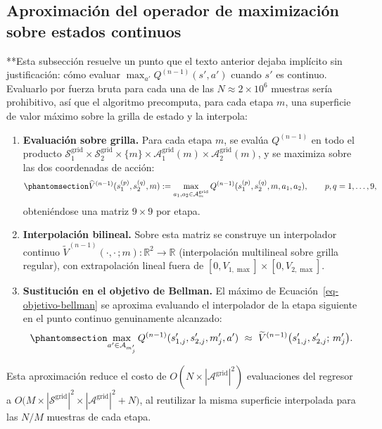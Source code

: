 \documentclass[
  spanish,
  letterpaper,
]{scrreprt}
\theoremstyle{definition}
\theoremstyle{remark}
\begin{document}
\subsection{Aproximación del operador de maximización sobre estados
continuos}\label{sec-max-operador}

**Esta subsección resuelve un punto que el texto anterior dejaba
implícito sin justificación: cómo evaluar \(\max_{a'}Q^{(n-1)}(s',a')\)
cuando \(s'\) es continuo. Evaluarlo por fuerza bruta para cada una de
las \(N\approx 2\times10^6\) muestras sería prohibitivo, así que el
algoritmo precomputa, para cada etapa \(m\), una superficie de valor
máximo sobre la grilla de estado y la interpola:

\begin{enumerate}
\def\labelenumi{\arabic{enumi}.}
\item
  \textbf{Evaluación sobre grilla.} Para cada etapa \(m\), se evalúa
  \(Q^{(n-1)}\) en todo el producto
  \(\mathcal S_1^{\text{grid}}\times\mathcal S_2^{\text{grid}}\times\{m\}\times\mathcal A_1^{\text{grid}}(m)\times\mathcal A_2^{\text{grid}}(m)\),
  y se maximiza sobre las dos coordenadas de acción:
  \begin{equation}\protect\phantomsection\label{eq-maxq-grilla}{\widehat V^{(n-1)}(s_1^{(p)},s_2^{(q)},m) := \max_{a_1,a_2\in\mathcal A_m^{\text{grid}}} Q^{(n-1)}(s_1^{(p)},s_2^{(q)},m,a_1,a_2), \qquad p,q=1,\dots,9,}\end{equation}
  obteniéndose una matriz \(9\times9\) por etapa.
\item
  \textbf{Interpolación bilineal.} Sobre esta matriz se construye un
  interpolador continuo
  \(\widetilde V^{(n-1)}(\cdot,\cdot\,;m):\mathbb R^2\to\mathbb R\)
  (interpolación multilineal sobre grilla regular), con extrapolación
  lineal fuera de \([0,V_{1,\max}]\times[0,V_{2,\max}]\).
\item
  \textbf{Sustitución en el objetivo de Bellman.} El máximo de
  Ecuación~\ref{eq-objetivo-bellman} se aproxima evaluando el
  interpolador de la etapa siguiente en el punto continuo genuinamente
  alcanzado:
  \begin{equation}\protect\phantomsection\label{eq-maxq-interp}{\max_{a'\in\mathcal A_{m_j'}} Q^{(n-1)}(s'_{1,j},s'_{2,j},m_j',a') \ \approx\ \widetilde V^{(n-1)}\big(s'_{1,j},s'_{2,j};\,m_j'\big).}\end{equation}
\end{enumerate}

Esta aproximación reduce el costo de
\(O(N\times|\mathcal A^{\text{grid}}|^2)\) evaluaciones del regresor a
\(O\big(M\times|\mathcal S^{\text{grid}}|^2\times|\mathcal A^{\text{grid}}|^2 + N\big)\),
al reutilizar la misma superficie interpolada para las \(N/M\) muestras
de cada etapa.
\end{document}
